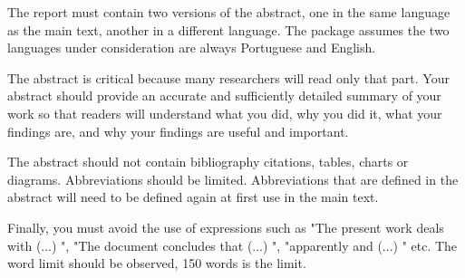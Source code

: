 \abstractEN %

The report must contain two versions of the abstract, one in the same language as the main text, another in a different language.  The package assumes the two languages under consideration are always Portuguese and English.

The abstract is critical because many researchers will read only that part. Your abstract should provide an accurate and sufficiently detailed summary of your work so that readers will understand what you did, why you did it, what your findings are, and why your findings are useful and important. 

The abstract should not contain bibliography citations, tables, charts or diagrams. Abbreviations should be limited. Abbreviations that are defined in the abstract will need to be defined again at first use in the main text. 

Finally, you must avoid the use of expressions such as "The present work deals with (...) ", "The document concludes that (...) ", "apparently and (...) " etc.
The word limit should be observed, 150 words is the limit.